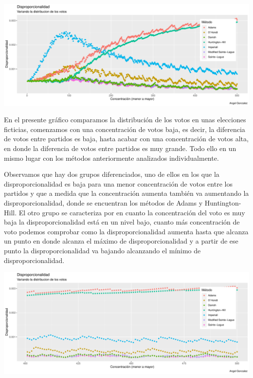\documentclass[12pt,a4paper,]{book}
\numberwithin{dummy}{section}
\theoremstyle{ocrenumbox}
\theoremstyle{blacknumex}
\theoremstyle{blacknumbox}
\theoremstyle{ocrenum}
\theoremstyle{ocrenum}
\begin{document}
\begin{center}\includegraphics[width=0.95\linewidth]{figurasR/unnamed-chunk-46-1} \end{center}

En el presente gráfico comparamos la distribución de los votos en unas
elecciones ficticias, comenzamos con una concentración de votos baja, es
decir, la diferencia de votos entre partidos es baja, hasta acabar con
una concentración de votos alta, en donde la diferencia de votos entre
partidos es muy grande. Todo ello en un mismo lugar con los métodos
anteriormente analizados individualmente.

Observamos que hay dos grupos diferenciados, uno de ellos en los que la
disproporcionalidad es baja para una menor concentración de votos entre
los partidos y que a medida que la concentración aumenta también va
aumentando la disproporcionalidad, donde se encuentran los métodos de
Adams y Huntington-Hill. El otro grupo se caracteriza por en cuanto la
concentración del voto es muy baja la disproporcionalidad está en un
nivel bajo, cuanto más concentración de voto podemos comprobar como la
disproporcionalidad aumenta hasta que alcanza un punto en donde alcanza
el máximo de disproporcionalidad y a partir de ese punto la
disproporcionalidad va bajando alcanzando el mínimo de
disproporcionalidad.

\begin{center}\includegraphics[width=0.95\linewidth]{figurasR/unnamed-chunk-47-1} \end{center}
\end{document}
